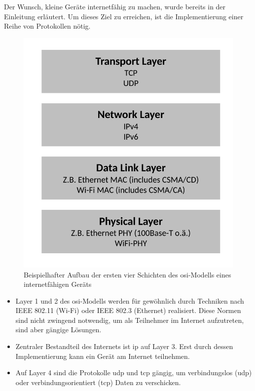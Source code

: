 Der Wunsch, kleine Geräte internetfähig zu machen, wurde bereits in der Einleitung erläutert. Um dieses Ziel zu erreichen, ist die Implementierung einer Reihe von Protokollen nötig.
\begin{figure}
	\centering
	\includegraphics[width=\textwidth/2]{Grafiken-Alex/internet-osi.pdf}
	\caption{Beispielhafter Aufbau der ersten vier Schichten des \ac{osi}-Modells eines internetfähigen Geräts}
	\label{internet-osi}
\end{figure}
\begin{itemize}
	\item Layer 1 und 2 des \ac{osi}-Modells werden für gewöhnlich durch Techniken nach IEEE 802.11 (Wi-Fi) oder IEEE 802.3 (Ethernet) realisiert. Diese Normen sind nicht zwingend notwendig, um als Teilnehmer im Internet aufzutreten, sind aber gängige Lösungen.
	\item Zentraler Bestandteil des Internets ist \ac{ip} auf Layer 3. Erst durch dessen Implementierung kann ein Gerät am Internet teilnehmen.
	\item Auf Layer 4 sind die Protokolle \ac{udp} und \ac{tcp} gängig, um verbindungslos (\ac{udp}) oder verbindungsorientiert (\ac{tcp}) Daten zu verschicken.
\end{itemize}
